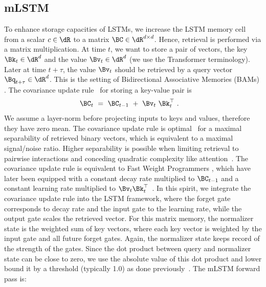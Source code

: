 \documentclass[dvipsnames]{article}
\begin{document}
\subsection{mLSTM}
\label{sec:mLSTM}
To enhance storage capacities of LSTMs,
we increase the LSTM memory cell from a scalar $c \in \dR$
to a matrix $\BC \in \dR^{d \times d}$.
Hence, retrieval is performed via a matrix multiplication.
At time $t$, we want to store a pair of vectors,
the key $\Bk_t \in \dR^d$ and the value $\Bv_t \in \dR^d$
(we use the Transformer terminology).
Later at time $t + \tau$, the value $\Bv_t$ should be retrieved
by a query vector $\Bq_{t+\tau} \in \dR^d$.
This is the setting of Bidirectional Associative Memories (BAMs)
\citep{Kohonen:72,Anderson:72,Nakano:72,Anderson:77}.
The covariance update rule~\citep{Sejnowski:77,Dayan:91}
for storing a key-value pair is
\begin{align}
\BC_t \ &= \ \BC_{t-1} \ + \ \Bv_{t} \ \Bk_t^\top \ .
\end{align}
We assume a layer-norm
before projecting inputs
to keys and values, therefore they have zero mean.
The covariance update rule is optimal~\citep{Dayan:91} for a
maximal separability of retrieved binary vectors,
which is equivalent to a maximal signal/noise ratio.
Higher separability is possible when limiting retrieval
to pairwise interactions and conceding quadratic complexity
like attention~\citep{Krotov:16,Krotov:17,Ramsauer:21}.
The covariance update rule is equivalent to Fast Weight Programmers
\citep{Schmidhuber:92ncfastweights,Schlag:21}, which
have later been equipped with
a constant decay rate multiplied to $\BC_{t-1}$ and
a constant learning rate multiplied to
$\Bv_{t} \Bk_t ^\top$~\citep{Ba:16}.
In this spirit,
we integrate the covariance update rule into the LSTM framework, where
the forget gate corresponds to decay rate and the input gate to the learning rate,
while the output gate scales the retrieved vector.
For this matrix memory, the normalizer state is the weighted sum of
key vectors, where each key vector is weighted by the input gate
and all future forget gates.
Again, the normalizer state keeps record of the strength of the gates.
Since the dot product between query and normalizer state
can be close to
zero, we use the absolute value of this dot product
and lower bound it by a threshold (typically 1.0) as
done previously~\citep{Sun:23arxiv}.
The mLSTM forward pass is:
\end{document}
